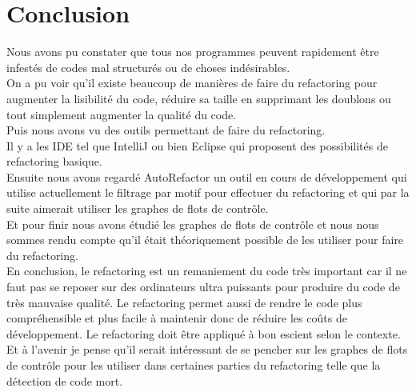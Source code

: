 \documentclass[a4paper,twoside,12pt,openright]{report}
\begin{document}
\newpage

\chapter{Conclusion}
Nous avons pu constater que tous nos programmes peuvent rapidement être infestés de codes mal structurés ou de choses indésirables.\\
On a pu voir qu'il existe beaucoup de manières de faire du refactoring pour augmenter la lisibilité du code, réduire sa taille en supprimant les doublons ou tout simplement augmenter la qualité du code.\\
Puis nous avons vu des outils permettant de faire du refactoring.\\
Il y a les IDE tel que IntelliJ ou bien Eclipse qui proposent des possibilités de refactoring basique.\\
Ensuite nous avons regardé AutoRefactor un outil en cours de développement qui utilise actuellement le filtrage par motif pour effectuer du refactoring et qui par la suite aimerait utiliser les graphes de flots de contrôle.\\
Et pour finir nous avons étudié les graphes de flots de contrôle et nous nous sommes rendu compte qu'il était théoriquement possible de les utiliser pour faire du refactoring.\\
En conclusion, le refactoring est un remaniement du code très important car il ne faut pas se reposer sur des ordinateurs ultra puissants pour produire du code de très mauvaise qualité. Le refactoring permet aussi de rendre le code plus compréhensible et plus facile à maintenir donc de réduire les coûts de développement.
Le refactoring doit être appliqué à bon escient selon le contexte.\\
Et à l'avenir je pense qu'il serait intéressant de se pencher sur les graphes de flots de contrôle pour les utiliser dans certaines parties du refactoring telle que la détection de code mort.\\




\end{document}
